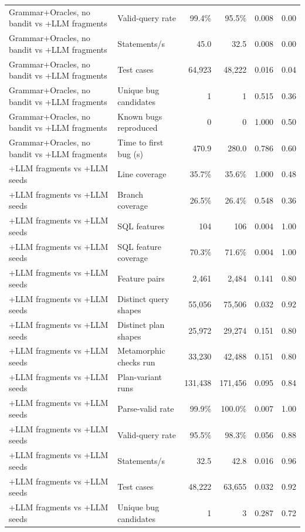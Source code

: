 \begin{table}[t]
\begin{tabular}{llrrrr}
    Grammar+Oracles, no bandit vs +LLM fragments & Valid-query rate & 99.4\% & 95.5\% & 0.008 & 0.00 \\
    Grammar+Oracles, no bandit vs +LLM fragments & Statements/s & 45.0 & 32.5 & 0.008 & 0.00 \\
    Grammar+Oracles, no bandit vs +LLM fragments & Test cases & 64{,}923 & 48{,}222 & 0.016 & 0.04 \\
    Grammar+Oracles, no bandit vs +LLM fragments & Unique bug candidates & 1 & 1 & 0.515 & 0.36 \\
    Grammar+Oracles, no bandit vs +LLM fragments & Known bugs reproduced & 0 & 0 & 1.000 & 0.50 \\
    Grammar+Oracles, no bandit vs +LLM fragments & Time to first bug (s) & 470.9 & 280.0 & 0.786 & 0.60 \\
    +LLM fragments vs +LLM seeds & Line coverage & 35.7\% & 35.6\% & 1.000 & 0.48 \\
    +LLM fragments vs +LLM seeds & Branch coverage & 26.5\% & 26.4\% & 0.548 & 0.36 \\
    +LLM fragments vs +LLM seeds & SQL features & 104 & 106 & 0.004 & 1.00 \\
    +LLM fragments vs +LLM seeds & SQL feature coverage & 70.3\% & 71.6\% & 0.004 & 1.00 \\
    +LLM fragments vs +LLM seeds & Feature pairs & 2{,}461 & 2{,}484 & 0.141 & 0.80 \\
    +LLM fragments vs +LLM seeds & Distinct query shapes & 55{,}056 & 75{,}506 & 0.032 & 0.92 \\
    +LLM fragments vs +LLM seeds & Distinct plan shapes & 25{,}972 & 29{,}274 & 0.151 & 0.80 \\
    +LLM fragments vs +LLM seeds & Metamorphic checks run & 33{,}230 & 42{,}488 & 0.151 & 0.80 \\
    +LLM fragments vs +LLM seeds & Plan-variant runs & 131{,}438 & 171{,}456 & 0.095 & 0.84 \\
    +LLM fragments vs +LLM seeds & Parse-valid rate & 99.9\% & 100.0\% & 0.007 & 1.00 \\
    +LLM fragments vs +LLM seeds & Valid-query rate & 95.5\% & 98.3\% & 0.056 & 0.88 \\
    +LLM fragments vs +LLM seeds & Statements/s & 32.5 & 42.8 & 0.016 & 0.96 \\
    +LLM fragments vs +LLM seeds & Test cases & 48{,}222 & 63{,}655 & 0.032 & 0.92 \\
    +LLM fragments vs +LLM seeds & Unique bug candidates & 1 & 3 & 0.287 & 0.72 \\

\end{tabular}
\end{table}
